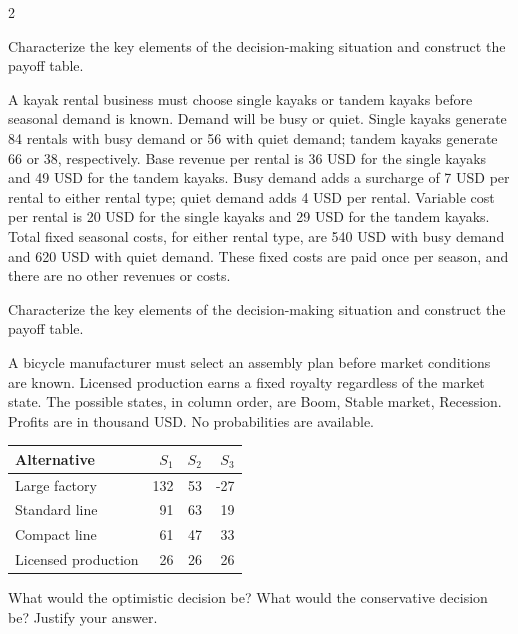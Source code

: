 \begin{multicols}{2}
\begin{minipage}{\linewidth}
Characterize the key elements of the decision-making situation  
and construct the payoff table. 

\end{minipage}\par

\begin{minipage}{\linewidth}
A kayak rental business must choose single kayaks or tandem kayaks before seasonal demand is known. Demand will be busy or quiet. Single kayaks generate 84 rentals with busy demand or 56 with quiet demand; tandem kayaks generate 66 or 38, respectively. Base revenue per rental is 36 USD for the single kayaks and 49 USD for the tandem kayaks. Busy demand adds a surcharge of 7 USD per rental to either rental type; quiet demand adds 4 USD per rental. Variable cost per rental is 20 USD for the single kayaks and 29 USD for the tandem kayaks. Total fixed seasonal costs, for either rental type, are 540 USD with busy demand and 620 USD with quiet demand. These fixed costs are paid once per season, and there are no other revenues or costs.

Characterize the key elements of the decision-making situation  
and construct the payoff table. 
\end{minipage}\par

\begin{minipage}{\linewidth}
A bicycle manufacturer must select an assembly plan before market conditions are known. Licensed production earns a fixed royalty regardless of the market state. The possible states, in column order, are Boom, Stable market, Recession. Profits are in thousand USD. No probabilities are available.
\begin{center}\small\setlength{\tabcolsep}{4pt}
\begin{tabular}{@{}lrrr@{}}\toprule
Alternative&$S_1$&$S_2$&$S_3$\\\midrule
Large factory&132&53&-27\\
Standard line&91&63&19\\
Compact line&61&47&33\\
Licensed production&26&26&26\\\bottomrule
\end{tabular}\end{center}

What would the optimistic decision be? What would the conservative decision be? Justify your answer. 
\end{minipage}\par


\end{multicols}
